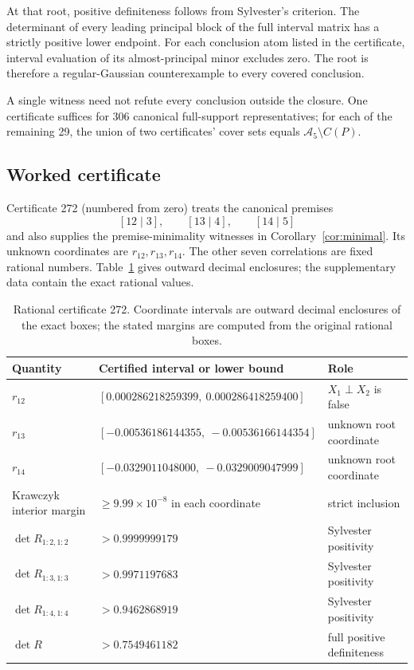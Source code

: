 \documentclass[10pt]{article}
\theoremstyle{definition}
\newcommand{\A}{\mathcal A}
\begin{document}
At that root, positive definiteness follows from Sylvester's criterion.  The determinant of every leading principal block of the full interval matrix has a strictly positive lower endpoint.  For each conclusion atom listed in the certificate, interval evaluation of its almost-principal minor excludes zero.  The root is therefore a regular-Gaussian counterexample to every covered conclusion.

A single witness need not refute every conclusion outside the closure.  One certificate suffices for 306 canonical full-support representatives; for each of the remaining 29, the union of two certificates' cover sets equals $\A_5\setminus C(P)$.

\subsection{Worked certificate}

Certificate 272 (numbered from zero) treats the canonical premises
\[
 [12\mid3],\qquad[13\mid4],\qquad[14\mid5]
\]
and also supplies the premise-minimality witnesses in Corollary~\ref{cor:minimal}.  Its unknown coordinates are $r_{12},r_{13},r_{14}$.  The other seven correlations are fixed rational numbers.  Table~\ref{tab:worked} gives outward decimal enclosures; the supplementary data contain the exact rational values.

\begin{table}[ht]
\centering
\caption{Rational certificate 272.  Coordinate intervals are outward decimal enclosures of the exact boxes; the stated margins are computed from the original rational boxes.}
\label{tab:worked}
\begin{tabular}{lll}
\toprule
Quantity & Certified interval or lower bound & Role\\
\midrule
$r_{12}$ & $[0.000286218259399,\ 0.000286418259400]$ & $X_1\perp X_2$ is false\\
$r_{13}$ & $[-0.00536186144355,\ -0.00536166144354]$ & unknown root coordinate\\
$r_{14}$ & $[-0.0329011048000,\ -0.0329009047999]$ & unknown root coordinate\\
Krawczyk interior margin & $\ge 9.99\times10^{-8}$ in each coordinate & strict inclusion\\
$\det R_{1:2,1:2}$ & $>0.9999999179$ & Sylvester positivity\\
$\det R_{1:3,1:3}$ & $>0.9971197683$ & Sylvester positivity\\
$\det R_{1:4,1:4}$ & $>0.9462868919$ & Sylvester positivity\\
$\det R$ & $>0.7549461182$ & full positive definiteness\\
\bottomrule
\end{tabular}
\end{table}
\end{document}
